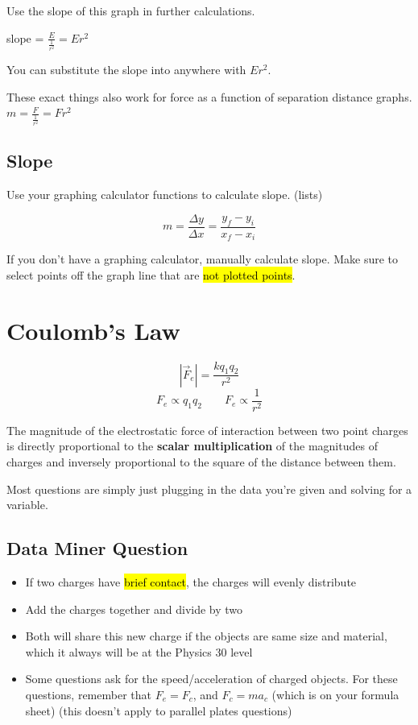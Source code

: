 \documentclass[a4paper,12pt]{article}
\begin{document}
Use the slope of this graph in further calculations.

slope = $\frac{E}{\frac{1}{r^2}} = Er^2$

You can substitute the slope into anywhere with $Er^2$.

These exact things also work for force as a function of separation distance graphs.\\$m = \frac{F}{\frac{1}{r^2}} = Fr^2$

\subsection{Slope}
Use your graphing calculator functions to calculate slope. (lists)

$$m = \frac{\Delta{y}}{\Delta{x}} = \frac{y_f - y_i}{x_f - x_i}$$

If you don't have a graphing calculator, manually calculate slope. Make sure to select points off the graph line that are \hl{not plotted points}.

\pagebreak
\section{Coulomb's Law}
\Large $$|\vec{F}_e| = \frac{kq_1q_2}{r^2}$$ \normalsize
$$F_e \propto q_1q_2 \qquad F_e \propto \frac{1}{r^2}$$

The magnitude of the electrostatic force of interaction between two point charges is directly proportional to the \textbf{scalar multiplication} of the magnitudes of charges and inversely proportional to the square of the distance between them.

Most questions are simply just plugging in the data you're given and solving for a variable.

\subsection{Data Miner Question}
\begin{itemize}
    \item{If two charges have \hl{brief contact}, the charges will evenly distribute}
    \item{Add the charges together and divide by two}
    \item{Both will share this new charge if the objects are same size and material, which it always will be at the Physics 30 level}
    \item{Some questions ask for the speed/acceleration of charged objects. For these questions, remember that $F_e = F_c$, and $F_c = ma_c$ (which is on your formula sheet) (this doesn't apply to parallel plates questions)}
\end{itemize}
\end{document}
